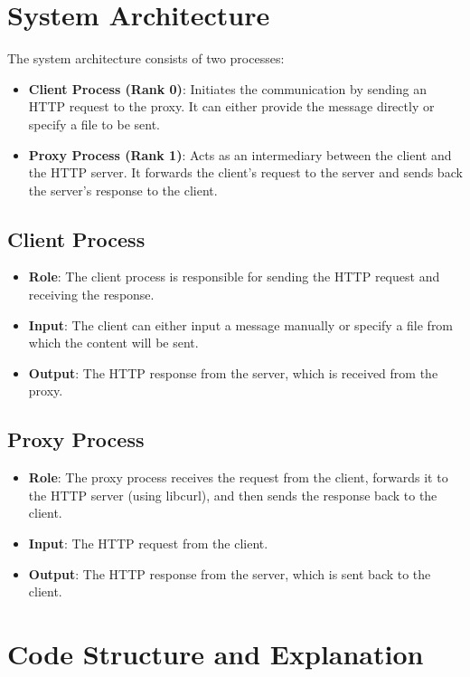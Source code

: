 \documentclass[a4paper,12pt]{article}
\begin{document}
\section{System Architecture}
The system architecture consists of two processes:
\begin{itemize}
    \item \textbf{Client Process (Rank 0)}: Initiates the communication by sending an HTTP request to the proxy. It can either provide the message directly or specify a file to be sent.
    \item \textbf{Proxy Process (Rank 1)}: Acts as an intermediary between the client and the HTTP server. It forwards the client's request to the server and sends back the server's response to the client.
\end{itemize}

\subsection{Client Process}
\begin{itemize}
    \item \textbf{Role}: The client process is responsible for sending the HTTP request and receiving the response.
    \item \textbf{Input}: The client can either input a message manually or specify a file from which the content will be sent.
    \item \textbf{Output}: The HTTP response from the server, which is received from the proxy.
\end{itemize}

\subsection{Proxy Process}
\begin{itemize}
    \item \textbf{Role}: The proxy process receives the request from the client, forwards it to the HTTP server (using libcurl), and then sends the response back to the client.
    \item \textbf{Input}: The HTTP request from the client.
    \item \textbf{Output}: The HTTP response from the server, which is sent back to the client.
\end{itemize}

\section{Code Structure and Explanation}
\end{document}
